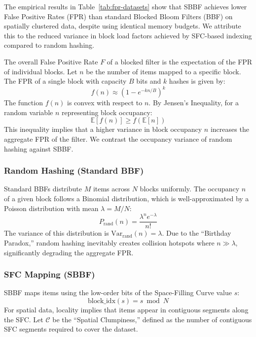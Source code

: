 \documentclass[conference,a4paper]{IEEEtran}
\begin{document}
The empirical results in Table~\ref{tab:fpr-datasets} show that SBBF achieves lower False Positive Rates (FPR) than standard Blocked Bloom Filters (BBF) on spatially clustered data, despite using identical memory budgets. We attribute this to the reduced variance in block load factors achieved by SFC-based indexing compared to random hashing.

The overall False Positive Rate $F$ of a blocked filter is the expectation of the FPR of individual blocks. Let $n$ be the number of items mapped to a specific block. The FPR of a single block with capacity $B$ bits and $k$ hashes is given by:
\begin{equation}
    f(n) \approx \left( 1 - e^{-kn/B} \right)^k
\end{equation}
The function $f(n)$ is convex with respect to $n$. By Jensen's Inequality, for a random variable $n$ representing block occupancy:
\begin{equation}
    \mathbb{E}[f(n)] \ge f(\mathbb{E}[n])
\end{equation}
This inequality implies that a higher variance in block occupancy $n$ increases the aggregate FPR of the filter. We contrast the occupancy variance of random hashing against SBBF.

\subsubsection{Random Hashing (Standard BBF)}
Standard BBFs distribute $M$ items across $N$ blocks uniformly. The occupancy $n$ of a given block follows a Binomial distribution, which is well-approximated by a Poisson distribution with mean $\lambda = M/N$:
\begin{equation}
    P_{\text{rand}}(n) = \frac{\lambda^n e^{-\lambda}}{n!}
\end{equation}
The variance of this distribution is $\text{Var}_{\text{rand}}(n) = \lambda$. Due to the ``Birthday Paradox,'' random hashing inevitably creates collision hotspots where $n \gg \lambda$, significantly degrading the aggregate FPR.

\subsubsection{SFC Mapping (SBBF)}
SBBF maps items using the low-order bits of the Space-Filling Curve value $s$:
\begin{equation}
    \text{block\_idx}(s) = s \bmod N
\end{equation}
For spatial data, locality implies that items appear in contiguous segments along the SFC. Let $\mathcal{C}$ be the ``Spatial Clumpiness,'' defined as the number of contiguous SFC segments required to cover the dataset.
\end{document}
